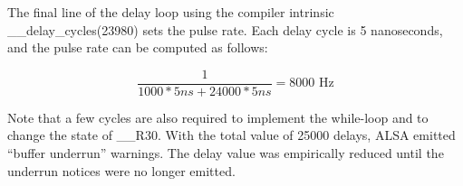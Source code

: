 The final line of the delay loop using the compiler intrinsic \_\_delay\_cycles(23980) sets the pulse rate.  Each delay cycle is 5 nanoseconds, and the pulse rate can be computed as follows:

\[ \frac{\text{1}}{1000*5ns + 24000*5ns}  = \text{8000 Hz} \]

Note that a few cycles are also required to implement the while-loop and to change the state of \_\_R30.  With the total value of 25000 delays, ALSA emitted ``buffer underrun'' warnings.  The delay value was empirically reduced until the underrun notices were no longer emitted.

